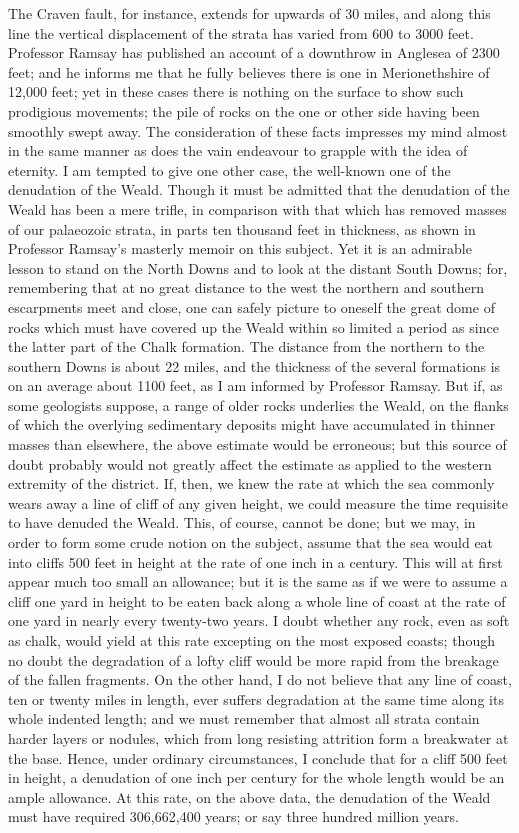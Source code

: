 The Craven fault, for instance, extends for upwards of 30 miles, and along this line the vertical displacement of the strata has varied from 600 to 3000 feet. Professor Ramsay has published an account of a downthrow in Anglesea of 2300 feet; and he informs me that he fully believes there is one in Merionethshire of 12,000 feet; yet in these cases there is nothing on the surface to show such prodigious movements; the pile of rocks on the one or other side having been smoothly swept away. The consideration of these facts impresses my mind almost in the same manner as does the vain endeavour to grapple with the idea of eternity.
I am tempted to give one other case, the well-known one of the denudation of the Weald. Though it must be admitted that the denudation of the Weald has been a mere trifle, in comparison with that which has removed masses of our palaeozoic strata, in parts ten thousand feet in thickness, as shown in Professor Ramsay's masterly memoir on this subject. Yet it is an admirable lesson to stand on the North Downs and to look at the distant South Downs; for, remembering that at no great distance to the west the northern and southern escarpments meet and close, one can safely picture to oneself the great dome of rocks which must have covered up the Weald within so limited a period as since the latter part of the Chalk formation. The distance from the northern to the southern Downs is about 22 miles, and the thickness of the several formations is on an average about 1100 feet, as I am informed by Professor Ramsay. But if, as some geologists suppose, a range of older rocks underlies the Weald, on the flanks of which the overlying sedimentary deposits might have accumulated in thinner masses than elsewhere, the above estimate would be erroneous; but this source of doubt probably would not greatly affect the estimate as applied to the western extremity of the district. If, then, we knew the rate at which the sea commonly wears away a line of cliff of any given height, we could measure the time requisite to have denuded the Weald. This, of course, cannot be done; but we may, in order to form some crude notion on the subject, assume that the sea would eat into cliffs 500 feet in height at the rate of one inch in a century. This will at first appear much too small an allowance; but it is the same as if we were to assume a cliff one yard in height to be eaten back along a whole line of coast at the rate of one yard in nearly every twenty-two years. I doubt whether any rock, even as soft as chalk, would yield at this rate excepting on the most exposed coasts; though no doubt the degradation of a lofty cliff would be more rapid from the breakage of the fallen fragments. On the other hand, I do not believe that any line of coast, ten or twenty miles in length, ever suffers degradation at the same time along its whole indented length; and we must remember that almost all strata contain harder layers or nodules, which from long resisting attrition form a breakwater at the base. Hence, under ordinary circumstances, I conclude that for a cliff 500 feet in height, a denudation of one inch per century for the whole length would be an ample allowance. At this rate, on the above data, the denudation of the Weald must have required 306,662,400 years; or say three hundred million years.
